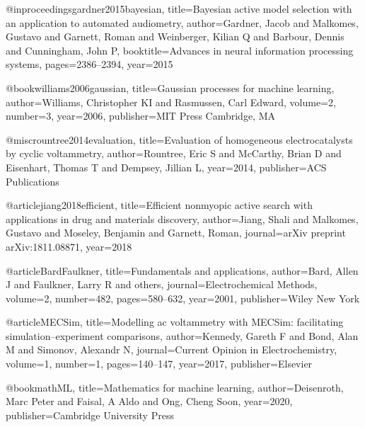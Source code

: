 @inproceedings{gardner2015bayesian,
  title={Bayesian active model selection with an application to automated audiometry},
  author={Gardner, Jacob and Malkomes, Gustavo and Garnett, Roman and Weinberger, Kilian Q and Barbour, Dennis and Cunningham, John P},
  booktitle={Advances in neural information processing systems},
  pages={2386--2394},
  year={2015}
}

@book{williams2006gaussian,
  title={Gaussian processes for machine learning},
  author={Williams, Christopher KI and Rasmussen, Carl Edward},
  volume={2},
  number={3},
  year={2006},
  publisher={MIT Press Cambridge, MA}
}


@misc{rountree2014evaluation,
  title={Evaluation of homogeneous electrocatalysts by cyclic voltammetry},
  author={Rountree, Eric S and McCarthy, Brian D and Eisenhart, Thomas T and Dempsey, Jillian L},
  year={2014},
  publisher={ACS Publications}
}

@article{jiang2018efficient,
  title={Efficient nonmyopic active search with applications in drug and materials discovery},
  author={Jiang, Shali and Malkomes, Gustavo and Moseley, Benjamin and Garnett, Roman},
  journal={arXiv preprint arXiv:1811.08871},
  year={2018}
}

@article{BardFaulkner,
  title={Fundamentals and applications},
  author={Bard, Allen J and Faulkner, Larry R and others},
  journal={Electrochemical Methods},
  volume={2},
  number={482},
  pages={580--632},
  year={2001},
  publisher={Wiley New York}
}

@article{MECSim,
  title={Modelling ac voltammetry with MECSim: facilitating simulation--experiment comparisons},
  author={Kennedy, Gareth F and Bond, Alan M and Simonov, Alexandr N},
  journal={Current Opinion in Electrochemistry},
  volume={1},
  number={1},
  pages={140--147},
  year={2017},
  publisher={Elsevier}
}

@book{mathML,
  title={Mathematics for machine learning},
  author={Deisenroth, Marc Peter and Faisal, A Aldo and Ong, Cheng Soon},
  year={2020},
  publisher={Cambridge University Press}
}

